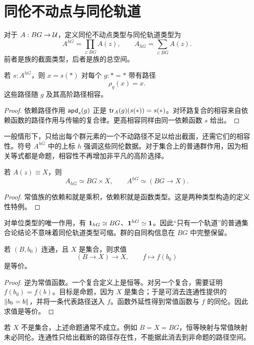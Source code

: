 \section{同伦不动点与同伦轨道}
\begin{definition}
对于 $A:BG\to\mathcal U$，定义同伦不动点类型与同伦轨道类型为
\[
A^{hG}=\prod_{z:BG}A(z),
\qquad
A_{hG}=\sum_{z:BG}A(z).
\]
前者是族的截面类型，后者是族的总空间。
\end{definition}
\begin{proposition}[不动点的相容条件]
若 $s:A^{hG}$，则 $x=s(*)$ 对每个 $g:*=*$ 带有路径
\[
\rho_g(x)=x.
\]
这些路径随 $g$ 及其高阶路径相容。
\end{proposition}
\begin{proof}
依赖路径作用 $\mathsf{apd}_s(g)$ 正是 $\mathsf{tr}_A(g)(s(*))=s(*)$。对环路复合的相容来自依赖函数的路径作用与传输的复合律。更高相容同样由同一依赖函数 $s$ 给出。
\end{proof}
\begin{remark}
一般情形下，只给出每个群元素的一个不动路径不足以给出截面，还需它们的相容性。符号 $A^{hG}$ 中的上标 $h$ 强调这些同伦数据。对于集合上的普通群作用，因为相关等式都是命题，相容性不再增加非平凡的高阶选择。
\end{remark}
\begin{proposition}[平凡作用的计算]
若 $A(z)\equiv X$，则
\[
A_{hG}\simeq BG\times X,
\qquad
A^{hG}\simeq(BG\to X).
\]
\end{proposition}
\begin{proof}
常值族的依赖和就是乘积，依赖积就是函数类型。这是两种类型构造的定义性特例。
\end{proof}
\begin{example}
对单位类型的唯一作用，有 $\mathbf 1_{hG}\simeq BG$、$\mathbf 1^{hG}\simeq\mathbf 1$。因此“只有一个轨道”的普通集合论结论不意味着同伦轨道类型可缩。群的自同构信息在 $BG$ 中完整保留。
\end{example}
\begin{proposition}[连通底到集合的函数]
若 $(B,b_0)$ 连通，且 $X$ 是集合，则求值
\[
(B\to X)\longrightarrow X,
\qquad f\longmapsto f(b_0)
\]
是等价。
\end{proposition}
\begin{proof}
逆为常值函数。一个复合定义上是恒等。对另一个复合，需要证明 $f(b_0)=f(b)$。目标是命题，因为 $X$ 是集合；于是可消去连通性提供的 $\left\|b_0=b\right\|$，并将一条代表路径送入 $f$。函数外延性得到常值函数与 $f$ 的同伦。因此求值是等价。
\end{proof}
\begin{remark}
若 $X$ 不是集合，上述命题通常不成立。例如 $B=X=BG$，恒等映射与常值映射未必同伦。连通性只给出截断的路径存在性，不能据此消去到非命题的路径空间。
\end{remark}

